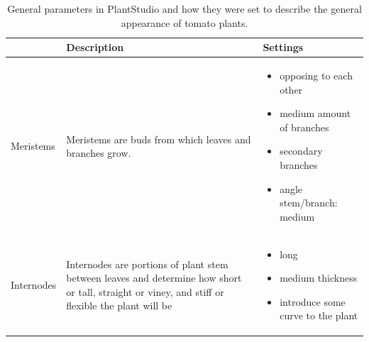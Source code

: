 \begin{longtable}[c]{@{}p{}p{}p{}@{}}
	\caption{General parameters in PlantStudio and how they were set to describe the general appearance of tomato plants.}
	\label{tab:parameters_plantStudio}\\
	\toprule
	& Description                                                                                                                                                                                                                 & Settings                                                                                                                                                                      \\* \midrule
	\endhead
	\bottomrule
	\endfoot
	\endlastfoot
	Meristems               & Meristems are buds from which leaves and branches grow.                                                                                                                                                                     & \vspace{-25pt}
	 \begin{itemize}
		\item opposing to each other \vspace{-10pt}
		\item medium amount of branches \vspace{-10pt}
		\item secondary branches \vspace{-10pt}
		\item angle stem/branch: medium \vspace{-10pt}   
	\end{itemize} \\
	Internodes              & Internodes are portions of plant stem between leaves and determine how short or tall, straight or viney, and stiff or flexible the plant will be                                                                            & \vspace{-25pt}
	\begin{itemize}
		\item long \vspace{-10pt}
		\item medium thickness \vspace{-10pt}
		\item introduce some curve to the plant \vspace{-10pt}
	\end{itemize} \\

\end{longtable}

